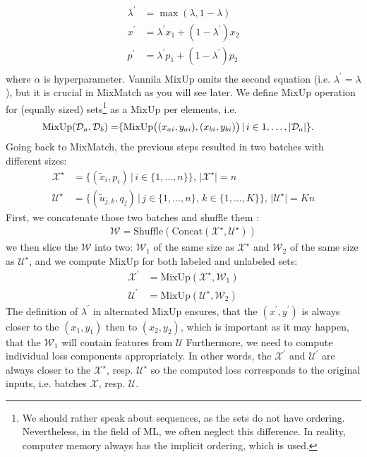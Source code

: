 \begin{enumerate}
\begin{align*}
            \lambda^\prime &= \max(\lambda,1-\lambda) \\
            x^\prime &= \lambda^\prime x_1 + (1-\lambda^\prime) x_2 \\
            p^\prime &= \lambda^\prime p_1 + (1-\lambda^\prime) p_2 \\
        \end{align*}
        where $\alpha$ is hyperparameter. Vannila MixUp omits the second equation (i.e. $\lambda^\prime = \lambda$), but it is crucial in MixMatch as you will
        see later. We define MixUp operation for (equally sized) sets\footnote{We should rather speak about sequences, as the sets do not have ordering. 
        Nevertheless, in the field of ML, we often neglect this difference. In reality, computer memory always has the implicit ordering, which is used.} 
        as a MixUp per elements, i.e.
        \begin{equation*}
            \begin{split}
                \text{MixUp}(\mathcal{D}_a,\mathcal{D}_b) = & \{\text{MixUp} \big{(} (x_{ai},y_{ai}),(x_{bi},y_{bi}) \big{)}\,|\,i \in {1,\dots,|\mathcal{D}_a|}  \}.
            \end{split}
        \end{equation*}
    Going back to MixMatch, the previous steps resulted in two batches with different sizes:
        \begin{align*}
            \mathcal{X}^\star &= \{ (\tilde{x}_i,p_i)\,|\, i \in \{1,\dots,n\}  \}, \, |\mathcal{X}^\star| = n \\
            \mathcal{U}^\star &= \{ (\tilde{u}_{j,k},q_j)\,|\, j \in \{1,\dots,n\},\,k \in \{1,\dots,K\}  \}, \, |\mathcal{U}^\star| = Kn 
        \end{align*}
    First, we concatenate those two batches and shuffle them :
        \begin{align*}
            \mathcal{W} = \text{Shuffle}(\text{Concat}(\mathcal{X}^\star,\mathcal{U}^\star))
        \end{align*}
    we then slice the $\mathcal{W}$ into two: $\mathcal{W}_1$ of the same size as $\mathcal{X}^\star$ and $\mathcal{W}_2$ of the same size 
    as $\mathcal{U}^\star$, and we compute MixUp for both labeled and unlabeled sets:
    \begin{align*}
        \mathcal{X}^\prime &= \text{MixUp}(\mathcal{X}^\star,\mathcal{W}_1) \\
        \mathcal{U}^\prime &= \text{MixUp}(\mathcal{U}^\star,\mathcal{W}_2)
    \end{align*}
    The definition of $\lambda^\prime$ in alternated MixUp ensures, that the $(x^\prime,y^\prime)$ is always closer to the 
    $(x_1,y_1)$ then to $(x_2,y_2)$, which is important as it may happen, that the $\mathcal{W}_1$ will contain features from $\mathcal{U}$
    Furthermore, we need to compute individual loss components appropriately. In other words, the $\mathcal{X}^\prime$ and $\mathcal{U}^\prime$ are always 
    closer to the $\mathcal{X}^\star$, resp. $\mathcal{U}^\star$ so the computed loss corresponds to the original inputs, i.e. batches $\mathcal{X}$, 
    resp. $\mathcal{U}$.
\end{enumerate}
